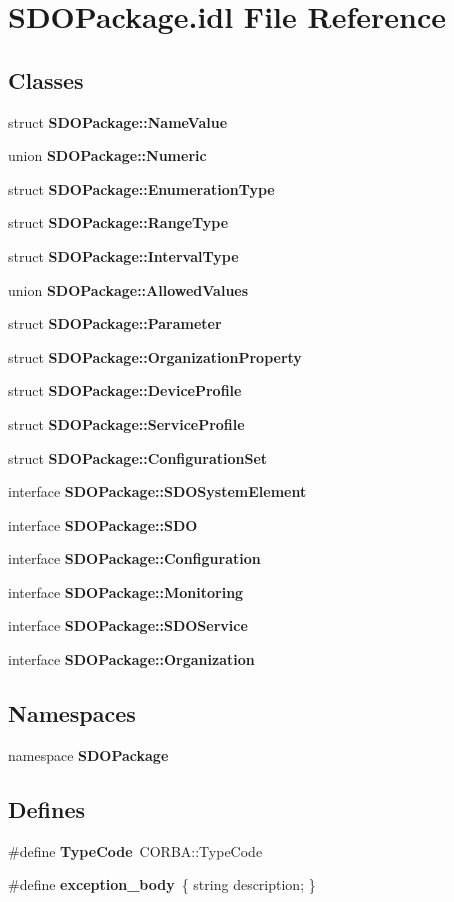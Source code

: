 \section{SDOPackage.idl File Reference}
\label{SDOPackage_8idl}
\subsection*{Classes}
\begin{DoxyCompactItemize}
\item 
struct {\bf SDOPackage::NameValue}
\item 
union {\bf SDOPackage::Numeric}
\item 
struct {\bf SDOPackage::EnumerationType}
\item 
struct {\bf SDOPackage::RangeType}
\item 
struct {\bf SDOPackage::IntervalType}
\item 
union {\bf SDOPackage::AllowedValues}
\item 
struct {\bf SDOPackage::Parameter}
\item 
struct {\bf SDOPackage::OrganizationProperty}
\item 
struct {\bf SDOPackage::DeviceProfile}
\item 
struct {\bf SDOPackage::ServiceProfile}
\item 
struct {\bf SDOPackage::ConfigurationSet}
\item 
interface {\bf SDOPackage::SDOSystemElement}
\item 
interface {\bf SDOPackage::SDO}
\item 
interface {\bf SDOPackage::Configuration}
\item 
interface {\bf SDOPackage::Monitoring}
\item 
interface {\bf SDOPackage::SDOService}
\item 
interface {\bf SDOPackage::Organization}
\end{DoxyCompactItemize}
\subsection*{Namespaces}
\begin{DoxyCompactItemize}
\item 
namespace {\bf SDOPackage}
\end{DoxyCompactItemize}
\subsection*{Defines}
\begin{DoxyCompactItemize}
\item 
\#define {\bf TypeCode}~CORBA::TypeCode
\item 
\#define {\bf exception\_\-body}~\{ string description; \}
\end{DoxyCompactItemize}
